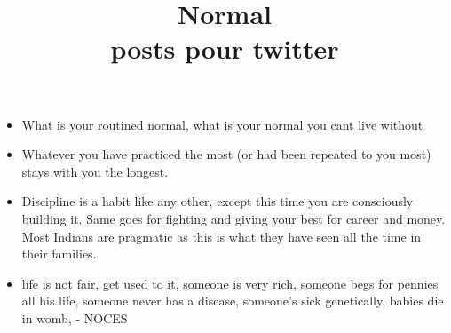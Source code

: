 \documentclass{article}
\title {\large {\textbf {Normal}} \\ \small {posts pour twitter}}
\begin{document}
\maketitle
\begin{itemize}
\item What is your routined normal, what is your normal you cant live without
\item Whatever you have practiced the most (or had been repeated to you most) stays with you the longest.  
\item Discipline is a habit like any other, except this time you are consciously building it. Same goes for fighting and giving your best for career and money. Most Indians are pragmatic as this is what they have seen all the time in their families.
\item life is not fair, get used to it, someone is very rich, someone begs for pennies all his life, someone never has a disease, someone's sick genetically, babies die in womb, - NOCES 
\end{itemize}
 
\end{document}
